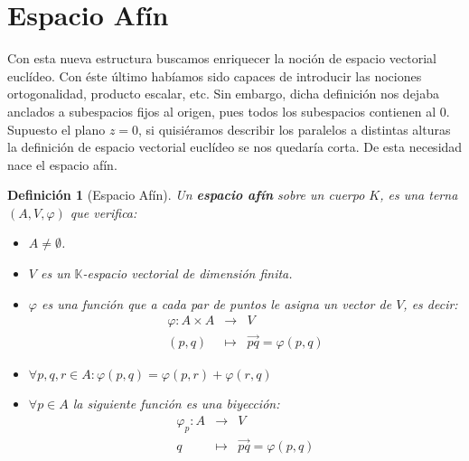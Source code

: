 \documentclass[10pt,a4paper,openright]{book}
\theoremstyle{break}
\newtheorem*{defi}{Definición}
\begin{document}
\section{Espacio Afín}
Con esta nueva estructura buscamos enriquecer la noción de espacio vectorial euclídeo. Con éste último habíamos sido capaces de introducir las nociones ortogonalidad, producto escalar, etc. Sin embargo, dicha definición nos dejaba anclados a subespacios fijos al origen, pues todos los subespacios contienen al 0. Supuesto el plano $z=0$, si quisiéramos describir los paralelos a distintas alturas la definición de espacio vectorial euclídeo se nos quedaría corta. De esta necesidad nace el espacio afín.

\begin{defi}[Espacio Afín]
Un \textbf{espacio afín} sobre un cuerpo $K$, es una terna $(A,V,\varphi)$ que verifica:
\begin{itemize}
\item $A \neq \emptyset$.

\item $V$ es un $\mathbb{K}$-espacio vectorial de dimensión finita.

\item $\varphi$ es una función que a cada par de puntos le asigna un vector de $V$, es decir:
\begin{eqnarray*}
\varphi : A\times A &\longrightarrow& V \\ (p,q) &\longmapsto& \vec{pq} = \varphi(p,q)
\end{eqnarray*}

\item $\forall p,q,r \in A: \varphi (p,q) = \varphi(p,r) + \varphi (r,q)$

\item $\forall p \in A$ la siguiente función es una biyección:
\begin{eqnarray*}
\varphi_p : A &\longrightarrow& V \\ q &\longmapsto& \vec{pq} = \varphi(p,q)
\end{eqnarray*}
\end{itemize}
\end{defi}
\end{document}
